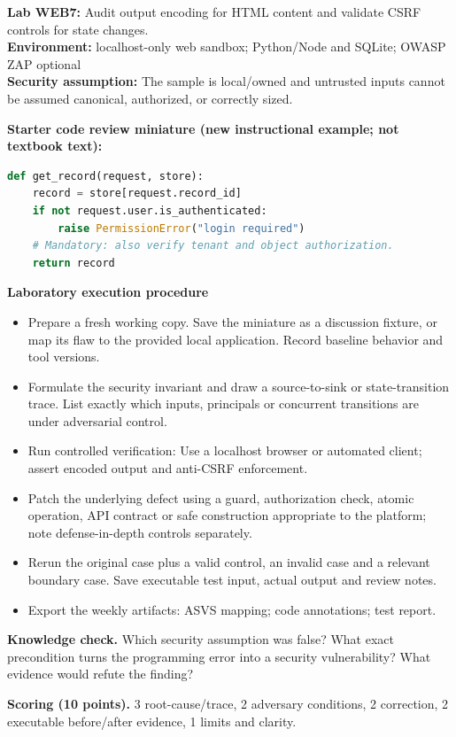 \documentclass[10pt,letterpaper]{article}
\begin{document}
\begin{insight}\textbf{Lab WEB7:} Audit output encoding for HTML content and validate CSRF controls for state changes.\\\textbf{Environment:} localhost-only web sandbox; Python/Node and SQLite; OWASP ZAP optional\\\textbf{Security assumption:} The sample is local/owned and untrusted inputs cannot be assumed canonical, authorized, or correctly sized.\end{insight}
\textbf{Starter code review miniature (new instructional example; not textbook text):}
\begin{lstlisting}[language=Python]
def get_record(request, store):
    record = store[request.record_id]
    if not request.user.is_authenticated:
        raise PermissionError("login required")
    # Mandatory: also verify tenant and object authorization.
    return record
\end{lstlisting}
\textbf{Laboratory execution procedure}
\begin{itemize}[leftmargin=*,itemsep=2pt]
\item Prepare a fresh working copy. Save the miniature as a discussion fixture, or map its flaw to the provided local application. Record baseline behavior and tool versions.
\item Formulate the security invariant and draw a source-to-sink or state-transition trace. List exactly which inputs, principals or concurrent transitions are under adversarial control.
\item Run controlled verification: Use a localhost browser or automated client; assert encoded output and anti-CSRF enforcement.
\item Patch the underlying defect using a guard, authorization check, atomic operation, API contract or safe construction appropriate to the platform; note defense-in-depth controls separately.
\item Rerun the original case plus a valid control, an invalid case and a relevant boundary case. Save executable test input, actual output and review notes.
\item Export the weekly artifacts: ASVS mapping; code annotations; test report.
\end{itemize}
\textbf{Knowledge check.} Which security assumption was false? What exact precondition turns the programming error into a security vulnerability? What evidence would refute the finding?

\textbf{Scoring (10 points).} 3 root-cause/trace, 2 adversary conditions, 2 correction, 2 executable before/after evidence, 1 limits and clarity.
\end{document}
